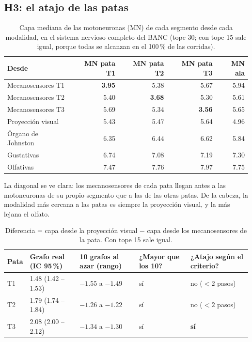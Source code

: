 \documentclass[11pt,letterpaper]{article}
\begin{document}
\subsection{H3: el atajo de las patas}

\begin{table}[H]
\centering
\small
\begin{tabularx}{\linewidth}{@{}LRRRR@{}}
\toprule
\textbf{Desde} & \textbf{MN pata T1} & \textbf{MN pata T2} & \textbf{MN pata T3} & \textbf{MN ala} \\
\midrule
Mecanosensores T1 & \textbf{3.95} & 5.38 & 5.67 & 5.94 \\
Mecanosensores T2 & 5.40 & \textbf{3.68} & 5.30 & 5.61 \\
Mecanosensores T3 & 5.69 & 5.34 & \textbf{3.56} & 5.65 \\
Proyección visual & 5.43 & 5.47 & 5.64 & 4.96 \\
Órgano de Johnston & 6.35 & 6.44 & 6.62 & 5.84 \\
Gustativas & 6.74 & 7.08 & 7.19 & 7.30 \\
Olfativas & 7.47 & 7.76 & 7.97 & 7.75 \\
\bottomrule
\end{tabularx}
\caption{Capa mediana de las motoneuronas (MN) de cada segmento desde cada modalidad, en el sistema nervioso completo del BANC (tope 30; con tope 15 sale igual, porque todas se alcanzan en el 100\,\% de las corridas).}
\end{table}

\noindent La diagonal se ve clara: los mecanosensores de cada pata llegan antes a las motoneuronas de su propio segmento que a las de las otras patas. De la cabeza, la modalidad más cercana a las patas es siempre la proyección visual, y la más lejana el olfato.

\begin{table}[H]
\centering
\small
\begin{tabularx}{\linewidth}{@{}p{1.2cm}XXp{2.2cm}p{2.6cm}@{}}
\toprule
\textbf{Pata} & \textbf{Grafo real (IC 95\,\%)} & \textbf{10 grafos al azar (rango)} & \textbf{¿Mayor que los 10?} & \textbf{¿Atajo según el criterio?} \\
\midrule
T1 & 1.48 (1.42 -- 1.53) & $-1.55$ a $-1.49$ & sí & no ($<2$ pasos) \\
T2 & 1.79 (1.74 -- 1.84) & $-1.26$ a $-1.22$ & sí & no ($<2$ pasos) \\
T3 & 2.08 (2.00 -- 2.12) & $-1.34$ a $-1.30$ & sí & \textbf{sí} \\
\bottomrule
\end{tabularx}
\caption{Diferencia = capa desde la proyección visual $-$ capa desde los mecanosensores de la pata. Con tope 15 sale igual.}
\label{tab:h3}
\end{table}
\end{document}
